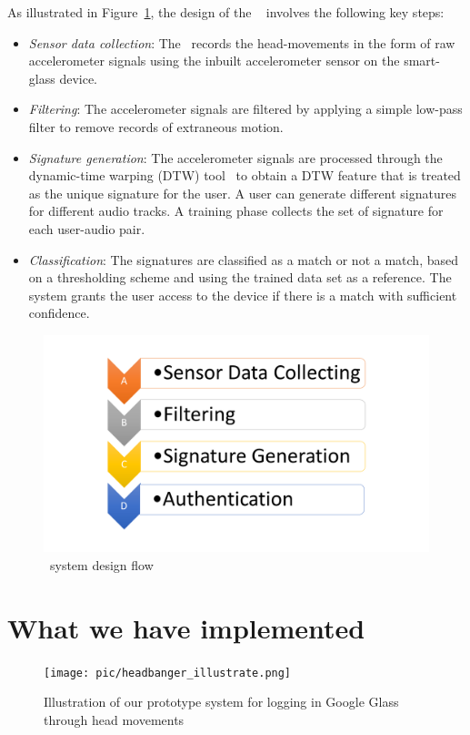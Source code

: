 \documentclass{sigchi}
\begin{document}
As illustrated in Figure~\ref{fig:sysarch}, the design of the \systemname~ involves the following key steps:
\begin{itemize}
\item {\em Sensor data collection}: The \systemname~records the head-movements
in the form of raw accelerometer signals using the inbuilt accelerometer
sensor on the smart-glass device.
\item {\em Filtering}: The accelerometer signals are filtered by applying
a simple low-pass filter to remove records of extraneous motion.
\item {\em Signature generation}: The accelerometer signals are
processed through the dynamic-time warping (DTW) tool~\cite{dtw} to obtain a
DTW
feature that is treated as the unique signature for the user.
A user can generate different signatures for different audio tracks. A
training phase collects the set of signature for each user-audio pair.
\item {\em Classification}: The signatures are classified as a match or
not a match, based on a thresholding scheme and using the
trained data set as a reference. The system grants the user
access to the device if there is a match with sufficient confidence.
\end{itemize}
\begin{figure}[t]
\centering
\includegraphics[width=\columnwidth]{pic/workflow.png}
\caption{\systemname~system design flow}
\label{fig:sysarch}
\end{figure}

\fi

\section{What we have implemented}

\begin{figure}[t]
\centering
\texttt{[image: pic/headbanger\_illustrate.png]}
\caption{\label{fig:illustrate} Illustration of our prototype system for logging in Google Glass through head movements}
\end{figure}
\end{document}
